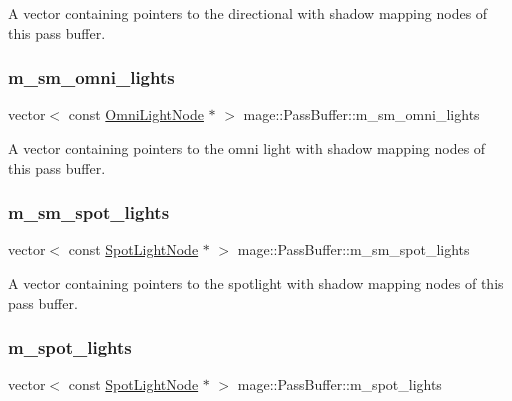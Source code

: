 A vector containing pointers to the directional with shadow mapping nodes of this pass buffer. \hypertarget{structmage_1_1_pass_buffer_a49209cf46f4e6c2328eb8a36d647a2d9}{}\label{structmage_1_1_pass_buffer_a49209cf46f4e6c2328eb8a36d647a2d9} 
\subsubsection{\texorpdfstring{m\+\_\+sm\+\_\+omni\+\_\+lights}{m\_sm\_omni\_lights}}
{\footnotesize\ttfamily vector$<$ const \hyperlink{namespacemage_a1724c6e6b6b5ba535cdd967cbbb4a669}{Omni\+Light\+Node} $\ast$ $>$ mage\+::\+Pass\+Buffer\+::m\+\_\+sm\+\_\+omni\+\_\+lights\hspace{0.3cm}{\ttfamily [private]}}

A vector containing pointers to the omni light with shadow mapping nodes of this pass buffer. \hypertarget{structmage_1_1_pass_buffer_aa28fb6d14ea463f82f35117e8dfa23fc}{}\label{structmage_1_1_pass_buffer_aa28fb6d14ea463f82f35117e8dfa23fc} 
\subsubsection{\texorpdfstring{m\+\_\+sm\+\_\+spot\+\_\+lights}{m\_sm\_spot\_lights}}
{\footnotesize\ttfamily vector$<$ const \hyperlink{namespacemage_aeed5dee4ff6c591eabb0e9114256df4a}{Spot\+Light\+Node} $\ast$ $>$ mage\+::\+Pass\+Buffer\+::m\+\_\+sm\+\_\+spot\+\_\+lights\hspace{0.3cm}{\ttfamily [private]}}

A vector containing pointers to the spotlight with shadow mapping nodes of this pass buffer. \hypertarget{structmage_1_1_pass_buffer_a45b9dd8e0ecb9c0110b53a5a744519bb}{}\label{structmage_1_1_pass_buffer_a45b9dd8e0ecb9c0110b53a5a744519bb} 
\subsubsection{\texorpdfstring{m\+\_\+spot\+\_\+lights}{m\_spot\_lights}}
{\footnotesize\ttfamily vector$<$ const \hyperlink{namespacemage_aeed5dee4ff6c591eabb0e9114256df4a}{Spot\+Light\+Node} $\ast$ $>$ mage\+::\+Pass\+Buffer\+::m\+\_\+spot\+\_\+lights\hspace{0.3cm}{\ttfamily [private]}}

